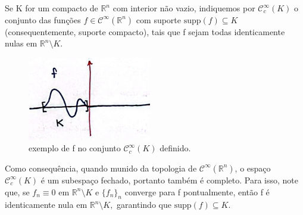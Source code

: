 \documentclass[../distribution_theory_notes.tex]{subfiles}
\begin{document}
\begin{example}
	Se K for um compacto de \(\mathbb{R}^{n}\) com interior não vazio, indiquemos por \(\mathcal{C}_{c}^{\infty}(K)\) o conjunto das funções \(f\in \mathcal{C}^{\infty}(\mathbb{R}^{n})\) com suporte \(\mathrm{supp}(f)\subseteq K\) (consequentemente, suporte compacto), tais que f sejam todas identicamente nulas em \(\mathbb{R}^{n}\setminus{K}.\)
	\begin{figure}[H]
		\begin{center}
			\includegraphics[height=\textheight, width=\textwidth, keepaspectratio]{./Images/compact_support_04.png}
		\end{center}
		\caption{exemplo de f no conjunto \(\mathcal{C}_{c}^{\infty}(K)\) definido.}
	\end{figure}

	Como consequência, quando munido da topologia de \(\mathcal{C}^{\infty}(\mathbb{R}^{n})\), o espaço \(\mathcal{C}_{c}^{\infty}(K)\) é um subespaço fechado, portanto também é completo. Para isso, note que, se \(f_{n}\equiv 0\) em \(\mathbb{R}^{n}\setminus{K}\) e \(\{f_{n}\}_{n}\) converge para f pontualmente, então f é identicamente nula em \(\mathbb{R}^{n}\setminus{K},\) garantindo que \(\mathrm{supp}(f)\subseteq K.\)
\end{example}
\end{document}
